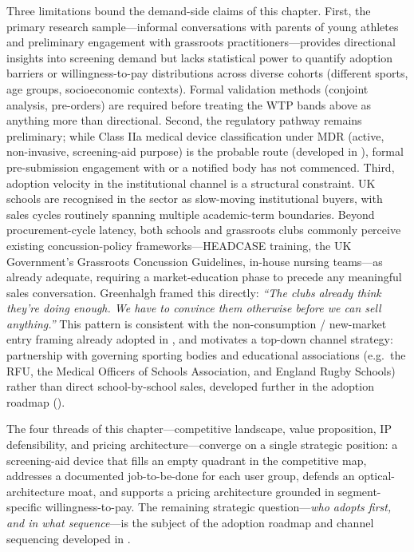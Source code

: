 Three limitations bound the demand-side claims of this chapter. First, the primary research sample---informal conversations with parents of young athletes and preliminary engagement with grassroots practitioners---provides directional insights into screening demand but lacks statistical power to quantify adoption barriers or willingness-to-pay distributions across diverse cohorts (different sports, age groups, socioeconomic contexts). Formal validation methods (conjoint analysis, pre-orders) are required before treating the WTP bands above as anything more than directional. Second, the regulatory pathway remains preliminary; while Class IIa medical device classification under MDR (active, non-invasive, screening-aid purpose) is the probable route (developed in ), formal pre-submission engagement with  or a notified body has not commenced. Third, adoption velocity in the institutional channel is a structural constraint. UK schools are recognised in the sector as slow-moving institutional buyers, with sales cycles routinely spanning multiple academic-term boundaries. Beyond procurement-cycle latency, both schools and grassroots clubs commonly perceive existing concussion-policy frameworks---HEADCASE training, the UK Government's Grassroots Concussion Guidelines, in-house nursing teams---as already adequate, requiring a market-education phase to precede any meaningful sales conversation. Greenhalgh framed this directly: \textit{``The clubs already think they're doing enough. We have to convince them otherwise before we can sell anything.''} This pattern is consistent with the non-consumption / new-market entry framing already adopted in , and motivates a top-down channel strategy: partnership with governing sporting bodies and educational associations (e.g.\ the RFU, the Medical Officers of Schools Association, and England Rugby Schools) rather than direct school-by-school sales, developed further in the adoption roadmap ().

The four threads of this chapter---competitive landscape, value proposition, IP defensibility, and pricing architecture---converge on a single strategic position: a screening-aid device that fills an empty quadrant in the competitive map, addresses a documented job-to-be-done for each user group, defends an optical-architecture moat, and supports a pricing architecture grounded in segment-specific willingness-to-pay. The remaining strategic question---\textit{who adopts first, and in what sequence}---is the subject of the adoption roadmap and channel sequencing developed in .
